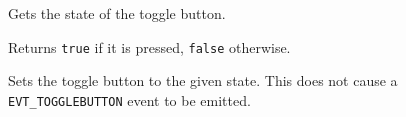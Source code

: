 \label{wxtogglebuttongetvalue}


Gets the state of the toggle button.


Returns {\tt true} if it is pressed, {\tt false} otherwise.

\label{wxtogglebuttonsetvalue}


Sets the toggle button to the given state. This does not cause a
{\tt EVT\_TOGGLEBUTTON} event to be emitted.


